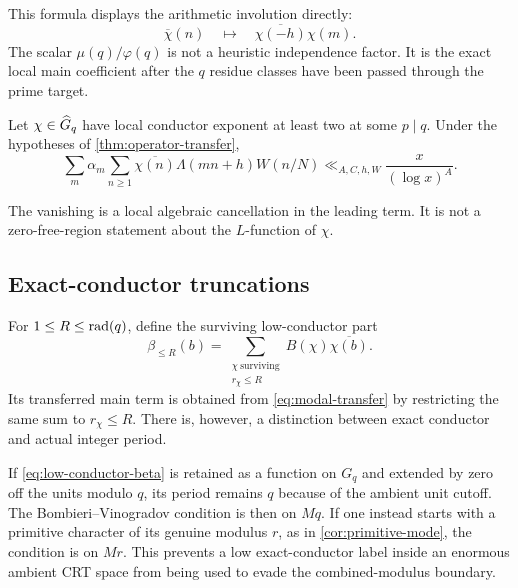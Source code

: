 This formula displays the arithmetic involution directly:
\begin{equation}\label{eq:mode-involution}
 \overline\chi(n)
 \quad\longmapsto\quad
 \overline{\chi(-h)}\chi(m).
\end{equation}
The scalar $\mu(q)/\varphi(q)$ is not a heuristic independence factor.  It
is the exact local main coefficient after the $q$ residue classes have been
passed through the prime target.

\begin{corollary}
\label{cor:higher-exponent-annihilation}
Let $\chi\in\widehat G_q$ have local conductor exponent at least two at some
$p\mid q$.  Under the hypotheses of \cref{thm:operator-transfer},
\begin{equation}\label{eq:higher-mode-transfer}
 \sum_m\alpha_m\sum_{n\geq1}
 \overline{\chi(n)}\Lambda(mn+h)W(n/N)
 \ll_{A,C,h,W}\frac{x}{(\log x)^A}.
\end{equation}
\end{corollary}

The vanishing is a local algebraic cancellation in the leading term.  It is
not a zero-free-region statement about the $L$-function of $\chi$.

\subsection{Exact-conductor truncations}

For $1\leq R\leq\operatorname{rad}(q)$, define the surviving low-conductor part
\begin{equation}\label{eq:low-conductor-beta}
 \beta_{\leq R}(b)
 =\sum_{\substack{\chi\ \mathrm{surviving}\\r_\chi\leq R}}
 B(\chi)\overline{\chi(b)}.
\end{equation}
Its transferred main term is obtained from \eqref{eq:modal-transfer} by
restricting the same sum to $r_\chi\leq R$.  There is, however, a distinction
between exact conductor and actual integer period.

If \eqref{eq:low-conductor-beta} is retained as a function on $G_q$ and
extended by zero off the units modulo $q$, its period remains $q$ because of
the ambient unit cutoff.  The Bombieri--Vinogradov condition is then on
$Mq$.  If one instead starts with a primitive character of its genuine
modulus $r$, as in \cref{cor:primitive-mode}, the condition is on $Mr$.
This prevents a low exact-conductor label inside an enormous ambient CRT
space from being used to evade the combined-modulus boundary.

